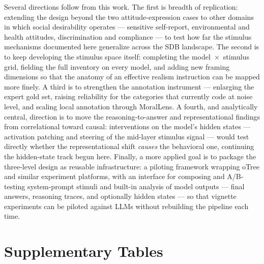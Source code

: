 \documentclass[14pt,a4paper]{extarticle}
\begin{document}
Several directions follow from this work. The first is breadth of replication: extending the design beyond the two attitude-expression cases to other domains in which social desirability operates --- sensitive self-report, environmental and health attitudes, discrimination and compliance --- to test how far the stimulus mechanisms documented here generalize across the SDB landscape. The second is to keep developing the stimulus space itself: completing the model~$\times$~stimulus grid, fielding the full inventory on every model, and adding new framing dimensions so that the anatomy of an effective realism instruction can be mapped more finely. A third is to strengthen the annotation instrument --- enlarging the expert gold set, raising reliability for the categories that currently code at noise level, and scaling local annotation through MoralLens. A fourth, and analytically central, direction is to move the reasoning-to-answer and representational findings from correlational toward causal: interventions on the model's hidden states --- activation patching and steering of the mid-layer stimulus signal --- would test directly whether the representational shift \emph{causes} the behavioral one, continuing the hidden-state track begun here. Finally, a more applied goal is to package the three-level design as reusable infrastructure: a piloting framework wrapping oTree and similar experiment platforms, with an interface for composing and A/B-testing system-prompt stimuli and built-in analysis of model outputs --- final answers, reasoning traces, and optionally hidden states --- so that vignette experiments can be piloted against LLMs without rebuilding the pipeline each time.

\newpage
\appendix
\section{Supplementary Tables}
\end{document}
